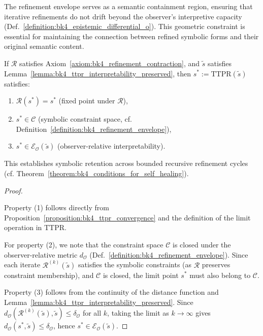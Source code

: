 The refinement envelope serves as a semantic containment region, ensuring that iterative refinements do not drift beyond the observer's interpretive capacity (Def.~\ref{definition:bk4_epistemic_differential_o}). This geometric constraint is essential for maintaining the connection between refined symbolic forms and their original semantic content.

\begin{theorem}
\label{theorem:bk4_ttpr_symbolic_stability}
If $\mathcal{R}$ satisfies Axiom~\ref{axiom:bk4_refinement_contraction}, and $\tilde{s}$ satisfies Lemma~\ref{lemma:bk4_ttpr_interpretability_preserved}, then $s^* := \mathrm{TTPR}(\tilde{s})$ satisfies:
\begin{enumerate}
    \item $\mathcal{R}(s^*) = s^*$ (fixed point under $\mathcal{R}$),
    \item $s^* \in \mathcal{C}$ (symbolic constraint space, cf. Definition~\ref{definition:bk4_refinement_envelope}),
    \item $s^* \in \mathcal{E}_{\mathcal{O}}(\tilde{s})$ (observer-relative interpretability).
\end{enumerate}
This establishes symbolic retention across bounded recursive refinement cycles (cf. Theorem~\ref{theorem:bk4_conditions_for_self_healing}).
\end{theorem}

\begin{proof}
\label{proof:bk4_symbolic_stability}
\leavevmode

Property (1) follows directly from Proposition~\ref{proposition:bk4_ttpr_convergence} and the definition of the limit operation in TTPR.

For property (2), we note that the constraint space $\mathcal{C}$ is closed under the observer-relative metric $d_{\mathcal{O}}$ (Def.~\ref{definition:bk4_refinement_envelope}). Since each iterate $\mathcal{R}^{(k)}(\tilde{s})$ satisfies the symbolic constraints (as $\mathcal{R}$ preserves constraint membership), and $\mathcal{C}$ is closed, the limit point $s^*$ must also belong to $\mathcal{C}$.

Property (3) follows from the continuity of the distance function and Lemma~\ref{lemma:bk4_ttpr_interpretability_preserved}. Since $d_{\mathcal{O}}(\mathcal{R}^{(k)}(\tilde{s}), \tilde{s}) \le \delta_{\mathcal{O}}$ for all $k$, taking the limit as $k \to \infty$ gives $d_{\mathcal{O}}(s^*, \tilde{s}) \le \delta_{\mathcal{O}}$, hence $s^* \in \mathcal{E}_{\mathcal{O}}(\tilde{s})$.
\end{proof}

